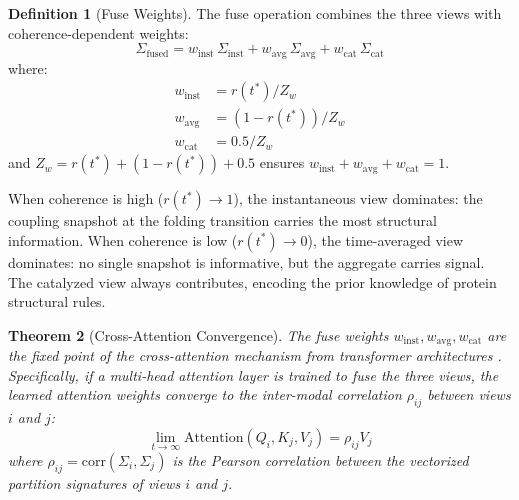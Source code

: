 \documentclass[11pt,twocolumn,a4paper]{article}
\newtheorem{theorem}{Theorem}[section]
\theoremstyle{definition}
\newtheorem{definition}[theorem]{Definition}
\theoremstyle{remark}
\newcommand{\Sig}{\Sigma}
\newcommand{\orderpar}{r}
\begin{document}
\begin{definition}[Fuse Weights]
\label{def:fuse_weights}
The fuse operation combines the three views with coherence-dependent weights:
\begin{equation}
\label{eq:fuse}
\Sig_{\text{fused}} = w_{\text{inst}} \, \Sig_{\text{inst}} + w_{\text{avg}} \, \Sig_{\text{avg}} + w_{\text{cat}} \, \Sig_{\text{cat}}
\end{equation}
where:
\begin{align}
w_{\text{inst}} &= \orderpar(t^*) / Z_w \\
w_{\text{avg}} &= (1 - \orderpar(t^*)) / Z_w \\
w_{\text{cat}} &= 0.5 / Z_w
\end{align}
and $Z_w = \orderpar(t^*) + (1 - \orderpar(t^*)) + 0.5$ ensures $w_{\text{inst}} + w_{\text{avg}} + w_{\text{cat}} = 1$.
\end{definition}

When coherence is high ($\orderpar(t^*) \to 1$), the instantaneous view dominates: the coupling snapshot at the folding transition carries the most structural information. When coherence is low ($\orderpar(t^*) \to 0$), the time-averaged view dominates: no single snapshot is informative, but the aggregate carries signal. The catalyzed view always contributes, encoding the prior knowledge of protein structural rules.

\begin{theorem}[Cross-Attention Convergence]
\label{thm:cross_attention}
The fuse weights $w_{\text{inst}}, w_{\text{avg}}, w_{\text{cat}}$ are the fixed point of the cross-attention mechanism from transformer architectures \citep{vaswani2017}. Specifically, if a multi-head attention layer is trained to fuse the three views, the learned attention weights converge to the inter-modal correlation $\rho_{ij}$ between views $i$ and $j$:
\begin{equation}
\lim_{t \to \infty} \text{Attention}(Q_i, K_j, V_j) = \rho_{ij} V_j
\end{equation}
where $\rho_{ij} = \text{corr}(\Sig_i, \Sig_j)$ is the Pearson correlation between the vectorized partition signatures of views $i$ and $j$.
\end{theorem}
\end{document}
